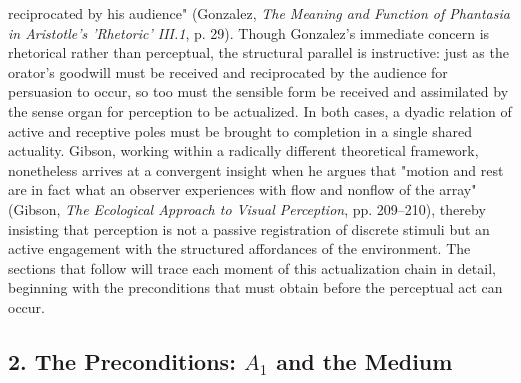 reciprocated by his audience" (Gonzalez, \textit{The Meaning and Function of Phantasia in Aristotle's 'Rhetoric' III.1}, p. 29). Though Gonzalez's immediate concern is rhetorical rather than perceptual, the structural parallel is instructive: just as the orator's goodwill must be received and reciprocated by the audience for persuasion to occur, so too must the sensible form be received and assimilated by the sense organ for perception to be actualized. In both cases, a dyadic relation of active and receptive poles must be brought to completion in a single shared actuality. Gibson, working within a radically different theoretical framework, nonetheless arrives at a convergent insight when he argues that "motion and rest are in fact what an observer experiences with flow and nonflow of the array" (Gibson, \textit{The Ecological Approach to Visual Perception}, pp. 209--210), thereby insisting that perception is not a passive registration of discrete stimuli but an active engagement with the structured affordances of the environment. The sections that follow will trace each moment of this actualization chain in detail, beginning with the preconditions that must obtain before the perceptual act can occur. 

\subsection*{2. The Preconditions: $A_1$ and the Medium}

